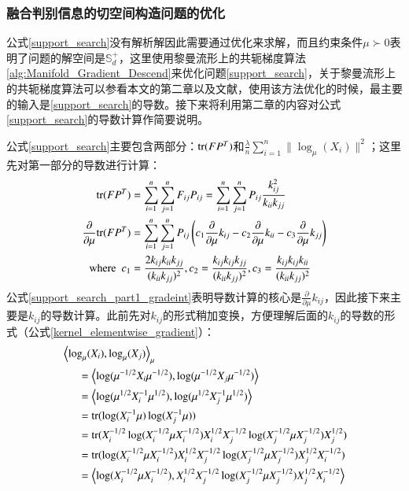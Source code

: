 \subsubsection{融合判别信息的切空间构造问题的优化}
\label{sec:discrim_single_support_opt}
公式\ref{support_search}没有解析解因此需要通过优化来求解，而且约束条件$\mu \succ 0$表明了问题的解空间是$\mathbb{S}_{d}^{+}$，这里使用黎曼流形上的共轭梯度算法\ref{alg:Manifold_Gradient_Descend}来优化问题\ref{support_search}，关于黎曼流形上的共轭梯度算法可以参看本文的第二章以及文献\cite{Conjugate_Gradient_Survery}，使用该方法优化的时候，最主要的输入是\ref{support_search}的导数。接下来将利用第二章的内容对公式\ref{support_search}的导数计算作简要说明。

公式\ref{support_search}主要包含两部分：${\rm tr}(FP^{T})$和$\frac{\lambda}{n}\sum_{i=1}^{n} \|\log_{\mu}(X_i)\|^2$；这里先对第一部分的导数进行计算：
\begin{equation}
\label{support_search_part1_gradeint}
\begin{split}
{\rm tr}(FP^{T})&=\sum_{i=1}^{n}\sum_{j=1}^{n}F_{ij}P_{ij}=\sum_{i=1}^{n}\sum_{j=1}^{n}P_{ij}\frac{k_{ij}^2}{k_{ii}k_{jj}}\\
\frac{\partial}{\partial \mu}{\rm tr}(FP^{T})&=\sum_{i=1}^{n}\sum_{j=1}^{n}P_{ij}\left(c_1\frac{\partial}{\partial \mu}k_{ij}-c_2\frac{\partial}{\partial \mu}k_{ii}-c_3\frac{\partial}{\partial \mu}k_{jj}\right)\\
{\rm where~~}c_1&=\frac{2k_{ij}k_{ii}k_{jj}}{(k_{ii}k_{jj})^2},c_2=\frac{k_{ij}k_{ij}k_{jj}}{(k_{ii}k_{jj})^2},c_3=\frac{k_{ij}k_{ij}k_{ii}}{(k_{ii}k_{jj})^2}
\end{split}
\end{equation}
公式\ref{support_search_part1_gradeint}表明导数计算的核心是$\frac{\partial}{\partial \mu}k_{ij}$，因此接下来主要是$k_{ij}$的导数计算。此前先对$k_{ij}$的形式稍加变换，方便理解后面的$k_{ij}$的导数的形式（公式\ref{kernel_elementwise_gradient}）：
\begin{equation}
\label{kernel_elementwise}
\begin{split}
&\left<\log_{\mu}(X_i),\log_{\mu}(X_j)\right>_{\mu}\\
&~~~~~~=\left<\log(\mu^{-1/2}X_{i}\mu^{-1/2}),\log(\mu^{-1/2}X_j\mu^{-1/2})\right>\\
&~~~~~~=\left<\log(\mu^{1/2}X_{i}^{-1}\mu^{1/2}),\log(\mu^{1/2}X_{j}^{-1}\mu^{1/2})\right>\\
&~~~~~~={\rm tr}(\log(X_{i}^{-1}\mu)\log(X_{j}^{-1}\mu))\\
&~~~~~~={\rm tr}(X_{i}^{-1/2}\log(X_{i}^{-1/2}\mu X_{i}^{-1/2})X_{i}^{1/2}X_{j}^{-1/2}\log(X_{j}^{-1/2}\mu X_{j}^{-1/2})X_{j}^{1/2})\\
&~~~~~~={\rm tr}(\log(X_{i}^{-1/2}\mu X_{i}^{-1/2})X_{i}^{1/2}X_{j}^{-1/2}\log(X_{j}^{-1/2}\mu X_{j}^{-1/2})X_{j}^{1/2}X_{i}^{-1/2})\\
&~~~~~~=\left<\log(X_{i}^{-1/2}\mu X_{i}^{-1/2}),X_{i}^{1/2}X_{j}^{-1/2}\log(X_{j}^{-1/2}\mu X_{j}^{-1/2})X_{j}^{1/2}X_{i}^{-1/2}\right>\\
\end{split}
\end{equation}
